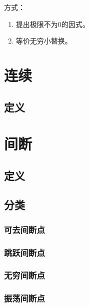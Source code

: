 \documentclass[UTF8]{ctexart}
\begin{document}
方式：

\begin{enumerate}
    \item 提出极限不为0的因式。
    \item 等价无穷小替换。
\end{enumerate}

\section{连续}
\subsection{定义}
\section{间断}
\subsection{定义}
\subsection{分类}
\subsubsection{可去间断点}
\subsubsection{跳跃间断点}
\subsubsection{无穷间断点}
\subsubsection{振荡间断点}
\end{document}
